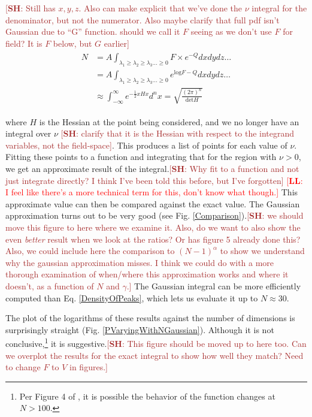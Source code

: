 \documentclass[12pt]{article}
\newcommand{\lfl}[1]{\textcolor{red}{[{\bf LL}: #1]}}
\newcommand{\SH}[1]{\textcolor{brown}{[{\bf SH}: #1]}}
\begin{document}
\SH{Still has $x,y,z$. Also can make explicit that we've done the $\nu$ integral for the denominator, but not the numerator. Also maybe clarify that full pdf isn't Gaussian due to ``G'' function. should we call it $F$ seeing as we don't use $F$ for field? It is $F$ below, but $G$ earlier}
\begin{align*}
\begin{split}
N &= A \int_{\lambda_1 \geq \lambda_2 \geq \lambda_3 \ldots \geq 0} F \times e^{-Q} dx dy dz \ldots \\
&=A\int_{\lambda_1 \geq \lambda_2 \geq \lambda_3 \ldots \geq 0} e^{\mathrm{log}F-Q} dx dy dz \ldots \\
&\approx \int_{-\infty}^{\infty} e^{-\frac{1}{2}xHx} d^nx = \sqrt{\frac{(2\pi)^n}{\mathrm{det} H}}
\end{split}
\end{align*}

\noindent where $H$ is the Hessian at the point being considered, and we no longer have an integral over $\nu$ \SH{clarify that it is the Hessian with respect to the integrand variables, not the field-space}. This produces a list of points for each value of $\nu$. Fitting these points to a function and integrating that for the region with $\nu > 0$, we get an approximate result of the integral.\SH{Why fit to a function and not just integrate directly? I think I've been told this before, but I've forgotten} \lfl{I feel like there's a more technical term for this, don't know what though.} This approximate value can then be compared against the exact value. The Gaussian approximation turns out to be very good (see Fig. \ref{Comparison}).\SH{we should move this figure to here where we examine it. Also, do we want to also show the even \emph{better} result when we look at the ratios? Or has figure 5 already done this? Also, we could include here the comparison to $(N-1)^\alpha$ to show we understand why the gaussian approximation misses. I think we could do with a more thorough examination of when/where this approximation works and where it doesn't, as a function of $N$ and $\gamma$.} The Gaussian integral can be more efficiently computed than Eq. \ref{DensityOfPeaks}, which lets us evaluate it up to $N\approx30$.

The plot of the logarithms of these results against the number of dimensions is surprisingly straight (Fig. \ref{PVaryingWithNGaussian}). Although it is not conclusive,\footnote{Per Figure 4 of \cite{Yamada2018}, it is possible the behavior of the function changes at $N >100$.} it is suggestive.\SH{This figure should be moved up to here too. Can we overplot the results for the exact integral to show how well they match? Need to change $F$ to $V$ in figures.}
\end{document}
